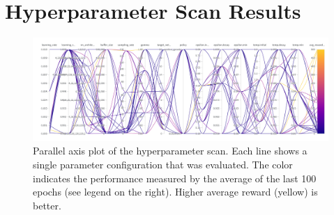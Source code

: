 \documentclass{article}
\begin{document}




\appendix
\section{Hyperparameter Scan Results}
\label{sec_hyperparameter_scan_results}

\begin{figure}[h!]
   \centering
   \includegraphics[width=\textwidth]{assets/hyperparamter-scan/W&B Chart 3_30_2023, 2 24 25 PM.png}
   \caption{Parallel axis plot of the hyperparameter scan. 
      Each line shows a single parameter configuration that was evaluated. 
      The color indicates the performance measured by the average of the last 100 epochs (see legend on the right). 
      Higher average reward (yellow) is better.
   }
   \label{fig_hyperparameter_scan_parallel_axis}
\end{figure}
\end{document}
